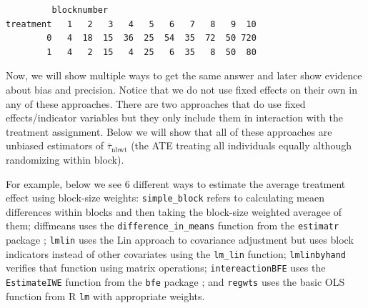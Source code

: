 \documentclass[
  12pt,
]{book}
\theoremstyle{definition}
\theoremstyle{definition}
\theoremstyle{definition}
\theoremstyle{remark}
\begin{document}
\begin{verbatim}
         blocknumber
treatment   1   2   3   4   5   6   7   8   9  10
        0   4  18  15  36  25  54  35  72  50 720
        1   4   2  15   4  25   6  35   8  50  80
\end{verbatim}

Now, we will show multiple ways to get the same answer and later show
evidence about bias and precision. Notice that we do not use fixed
effects on their own in any of these approaches. There are two
approaches that do use fixed effects/indicator variables but they only
include them in interaction with the treatment assignment. Below we will
show that all of these approaches are unbiased estimators of
\(\bar{\tau}_{\text{nbwt}}\) (the ATE treating all individuals equally
although randomizing within block).

For example, below we see 6 different ways to estimate the average
treatment effect using block-size weights: \texttt{simple\_block} refers
to calculating meaen differences within blocks and then taking the
block-size weighted averagee of them; diffmeans uses the
\texttt{difference\_in\_means} function from the \texttt{estimatr}
package \citep{R-estimatr}; \texttt{lmlin} uses the Lin approach to
covariance adjustment but uses block indicators instead of other
covariates using the \texttt{lm\_lin} function; \texttt{lmlinbyhand}
verifies that function using matrix operations; \texttt{intereactionBFE}
uses the \texttt{EstimateIWE} function from the \texttt{bfe} package
\citep{R-bfe}; and \texttt{regwts} uses the basic OLS function from R
\texttt{lm} with appropriate weights.
\end{document}
